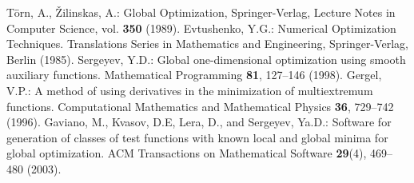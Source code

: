 \documentclass{svproc}
\begin{document}
\begin{thebibliography}{6}
T\"{o}rn, A., {\v Z}ilinskas, A.: Global Optimization, Springer-Verlag, Lecture Notes in Computer Science, vol. \textbf{350} (1989).
Evtushenko, Y.G.: Numerical Optimization Techniques. Translations Series in Mathematics and Engineering, Springer-Verlag, Berlin (1985).
Sergeyev, Y.D.: Global one-dimensional optimization using smooth auxiliary functions. Mathematical Programming \textbf{81}, 127--146 (1998).
Gergel, V.P.: A method of using derivatives in the minimization of multiextremum functions. Computational Mathematics and Mathematical Physics \textbf{36}, 729--742 (1996). 
Gaviano, M., Kvasov, D.E, Lera, D., and Sergeyev, Ya.D.: Software for generation of classes of test functions with known local and global minima for global optimization. ACM Transactions on Mathematical Software \textbf{29}(4), 469--480 (2003).


\end{thebibliography}
\end{document}
